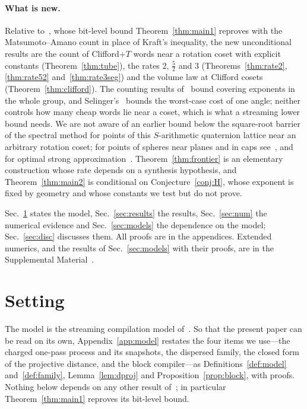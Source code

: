 \documentclass[aps,prx,twocolumn,superscriptaddress,nofootinbib,longbibliography]{revtex4-2}
\theoremstyle{plain}
\theoremstyle{definition}
\theoremstyle{remark}
\begin{document}
\paragraph{What is new.} Relative to~\cite{Paper1}, whose bit-level bound Theorem~\ref{thm:main1} reproves with the Matsumoto--Amano count in place of Kraft's inequality, the new unconditional results are the count of Clifford+$T$ words near a rotation coset with explicit constants (Theorem~\ref{thm:tube}), the rates $2$, $\tfrac52$ and $3$ (Theorems~\ref{thm:rate2}, \ref{thm:rate52} and~\ref{thm:rate3seg}) and the volume law at Clifford cosets (Theorem~\ref{thm:clifford}). The counting results of~\cite{PS18} bound covering exponents in the whole group, and Selinger's~\cite[Thm.~30]{Selinger15} bounds the worst-case cost of one angle; neither controls how many cheap words lie near a coset, which is what a streaming lower bound needs. We are not aware of an earlier bound below the square-root barrier of the spectral method for points of this $S$-arithmetic quaternion lattice near an arbitrary rotation coset; for points of spheres near planes and in caps see~\cite{BourgainRudnick}, and for optimal strong approximation~\cite{BKS,Sardari}. Theorem~\ref{thm:frontier} is an elementary construction whose rate depends on a synthesis hypothesis, and Theorem~\ref{thm:main2} is conditional on Conjecture~\ref{conj:H}, whose exponent is fixed by geometry and whose constants we test but do not prove.

Sec.~\ref{sec:setting} states the model, Sec.~\ref{sec:results} the results, Sec.~\ref{sec:num} the numerical evidence and Sec.~\ref{sec:models} the dependence on the model; Sec.~\ref{sec:disc} discusses them. All proofs are in the appendices. Extended numerics, and the results of Sec.~\ref{sec:models} with their proofs, are in the Supplemental Material~\cite{SM}.


\section{Setting}\label{sec:setting}

The model is the streaming compilation model of~\cite{Paper1}. So that the present paper can be read on its own, Appendix~\ref{app:model} restates the four items we use---the charged one-pass process and its snapshots, the dispersed family, the closed form of the projective distance, and the block compiler---as Definitions~\ref{def:model} and~\ref{def:family}, Lemma~\ref{lem:dproj} and Proposition~\ref{prop:block}, with proofs. Nothing below depends on any other result of~\cite{Paper1}; in particular Theorem~\ref{thm:main1} reproves its bit-level bound.
\end{document}
